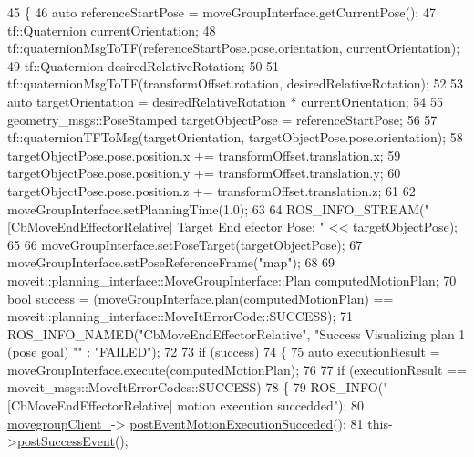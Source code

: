 \begin{DoxyCode}
45     \{
46         \textcolor{keyword}{auto} referenceStartPose = moveGroupInterface.getCurrentPose();
47         tf::Quaternion currentOrientation;
48         tf::quaternionMsgToTF(referenceStartPose.pose.orientation, currentOrientation);
49         tf::Quaternion desiredRelativeRotation;
50 
51         tf::quaternionMsgToTF(transformOffset.rotation, desiredRelativeRotation);
52 
53         \textcolor{keyword}{auto} targetOrientation = desiredRelativeRotation * currentOrientation;
54 
55         geometry\_msgs::PoseStamped targetObjectPose = referenceStartPose;
56 
57         tf::quaternionTFToMsg(targetOrientation, targetObjectPose.pose.orientation);
58         targetObjectPose.pose.position.x += transformOffset.translation.x;
59         targetObjectPose.pose.position.y += transformOffset.translation.y;
60         targetObjectPose.pose.position.z += transformOffset.translation.z;
61 
62         moveGroupInterface.setPlanningTime(1.0);
63 
64         ROS\_INFO\_STREAM(\textcolor{stringliteral}{"[CbMoveEndEffectorRelative] Target End efector Pose: "} << targetObjectPose);
65 
66         moveGroupInterface.setPoseTarget(targetObjectPose);
67         moveGroupInterface.setPoseReferenceFrame(\textcolor{stringliteral}{"map"});
68 
69         moveit::planning\_interface::MoveGroupInterface::Plan computedMotionPlan;
70         \textcolor{keywordtype}{bool} success = (moveGroupInterface.plan(computedMotionPlan) == 
      moveit::planning\_interface::MoveItErrorCode::SUCCESS);
71         ROS\_INFO\_NAMED(\textcolor{stringliteral}{"CbMoveEndEffectorRelative"}, \textcolor{stringliteral}{"Success Visualizing plan 1 (pose goal) %
      ""} : \textcolor{stringliteral}{"FAILED"});
72 
73         \textcolor{keywordflow}{if} (success)
74         \{
75             \textcolor{keyword}{auto} executionResult = moveGroupInterface.execute(computedMotionPlan);
76 
77             \textcolor{keywordflow}{if} (executionResult == moveit\_msgs::MoveItErrorCodes::SUCCESS)
78             \{
79                 ROS\_INFO(\textcolor{stringliteral}{"[CbMoveEndEffectorRelative] motion execution succedded"});
80                 \hyperlink{classcl__move__group__interface_1_1CbMoveEndEffectorRelative_ae742e6382bfb47fd9e1458bd6c8d3255}{movegroupClient\_}->
      \hyperlink{classcl__move__group__interface_1_1ClMoveGroup_aebaf269db373d41837bae87651458e54}{postEventMotionExecutionSucceded}();
81                 this->\hyperlink{classsmacc_1_1SmaccAsyncClientBehavior_adf18efe1f0e4eacc1277b8865a8a94b1}{postSuccessEvent}();

\end{DoxyCode}

